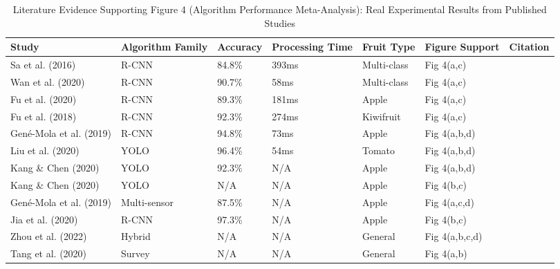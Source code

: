 \begin{table*}[htbp]
\centering
\small
\caption{Literature Evidence Supporting Figure 4 (Algorithm Performance Meta-Analysis): Real Experimental Results from Published Studies}
\label{tab:figure4_support}
\begin{tabular}{p{}p{}p{}p{}p{}p{}p{}}
\toprule
\textbf{Study} & \textbf{Algorithm Family} & \textbf{Accuracy} & \textbf{Processing Time} & \textbf{Fruit Type} & \textbf{Figure Support} & \textbf{Citation} \\ \midrule

Sa et al. (2016) & R-CNN & 84.8\% & 393ms & Multi-class & Fig 4(a,c) & \cite{sa2016deepfruits} \\

Wan et al. (2020) & R-CNN & 90.7\% & 58ms & Multi-class & Fig 4(a,c) & \cite{wan2020faster} \\

Fu et al. (2020) & R-CNN & 89.3\% & 181ms & Apple & Fig 4(a,c) & \cite{fu2020faster} \\

Fu et al. (2018) & R-CNN & 92.3\% & 274ms & Kiwifruit & Fig 4(a,c) & \cite{fu2018kiwifruit} \\

Gené-Mola et al. (2019) & R-CNN & 94.8\% & 73ms & Apple & Fig 4(a,b,d) & \cite{gene2019multi} \\

Liu et al. (2020) & YOLO & 96.4\% & 54ms & Tomato & Fig 4(a,b,d) & \cite{liu2020yolo} \\

Kang \& Chen (2020) & YOLO & 92.3\% & N/A & Apple & Fig 4(a,b,d) & \cite{kang2020fruit} \\

Kang \& Chen (2020) & YOLO & N/A & N/A & Apple & Fig 4(b,c) & \cite{kang2020fast} \\

Gené-Mola et al. (2019) & Multi-sensor & 87.5\% & N/A & Apple & Fig 4(a,c,d) & \cite{gene2019fruit} \\

Jia et al. (2020) & R-CNN & 97.3\% & N/A & Apple & Fig 4(b,c) & \cite{jia2020apple} \\

Zhou et al. (2022) & Hybrid & N/A & N/A & General & Fig 4(a,b,c,d) & \cite{zhou2022intelligent} \\

Tang et al. (2020) & Survey & N/A & N/A & General & Fig 4(a,b) & \cite{tang2020recognition} \\
\bottomrule
\end{tabular}
\end{table*}

